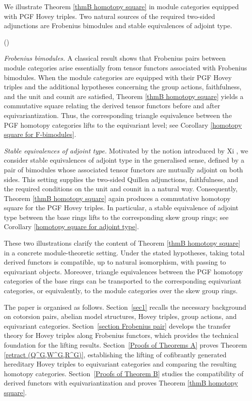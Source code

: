 \documentclass[12pt,twoside]{amsart}
\theoremstyle{bfupright head,slanted body}
\theoremstyle{bfupright head,upright body}
\theoremstyle{fixed bf head,slanted body}
\theoremstyle{fixed bf head,upright body}
\theoremstyle{numbered paragraph}
\newlength{\thmlistleft}        %
\newlength{\thmlistright}       %
\newlength{\thmlistpartopsep}   %
\newlength{\thmlisttopsep}      %
\newlength{\thmlistparsep}      %
\newlength{\thmlistitemsep}     %
\newcounter{rqm}
\newenvironment{rqm}{\begin{list}{\upshape (\arabic{rqm})}%
    {\usecounter{rqm}%
      \setlength{\leftmargin}{\thmlistleft}%
      \setlength{\labelwidth}{\thmlistleft}%
      \setlength{\rightmargin}{\thmlistright}%
      \setlength{\partopsep}{\thmlistpartopsep}%
      \setlength{\topsep}{\thmlisttopsep}%
      \setlength{\parsep}{\thmlistparsep}%
      \setlength{\itemsep}{\thmlistitemsep}}}%
  {\end{list}}%
\numberwithin{equation}{res}
\begin{document}
We illustrate Theorem \ref{thmB homotopy square} in module categories equipped with PGF Hovey triples.
Two natural sources of the required two-sided adjunctions are Frobenius bimodules and stable equivalences of adjoint type.

\begin{rqm}
\item \emph{Frobenius bimodules.}
A classical result \cite{1999CJG} shows that Frobenius pairs between module categories arise essentially from tensor functors associated with Frobenius bimodules.
When the module categories are equipped with their PGF Hovey triples and the additional hypotheses concerning the group actions, faithfulness, and the unit and counit are satisfied, Theorem \ref{thmB homotopy square} yields a commutative square relating the derived tensor functors before and after equivariantization.
Thus, the corresponding triangle equivalence between the PGF homotopy categories lifts to the equivariant level; see Corollary \ref{homotopy square for F-bimodules}.

\item \emph{Stable equivalences of adjoint type.}
Motivated by the notion introduced by Xi \cite[3.2]{2008Xi}, we consider stable equivalences of adjoint type in the generalised sense, defined by a pair of bimodules whose associated tensor functors are mutually adjoint on both sides.
This setting supplies the two-sided Quillen adjunctions, faithfulness, and the required conditions on the unit and counit in a natural way.
Consequently, Theorem \ref{thmB homotopy square} again produces a commutative homotopy square for the PGF Hovey triples.
In particular, a stable equivalence of adjoint type between the base rings lifts to the corresponding skew group rings; see Corollary \ref{homotopy square for adjoint type}.
\end{rqm}

These two illustrations clarify the content of Theorem \ref{thmB homotopy square} in a concrete module-theoretic setting.
Under the stated hypotheses, taking total derived functors is compatible, up to natural isomorphism, with passing to equivariant objects.
Moreover, triangle equivalences between the PGF homotopy categories of the base rings can be transported to the corresponding equivariant categories, or equivalently, to the module categories over the skew group rings.

The paper is organised as follows.
Section~\ref{sec1} recalls the necessary background on cotorsion pairs, abelian model structures, Hovey triples, group actions, and equivariant categories.
Section~\ref{section Frobenius pair} develops the transfer theory for Hovey triples along Frobenius functors, which provides the technical foundation for the lifting results.
Section~\ref{Proofs of Theorems A} proves Theorem \ref{retract (Q^G,W^G,R^G)}, establishing the lifting of cofibrantly generated hereditary Hovey triples to equivariant categories and comparing the resulting homotopy categories.
Section~\ref{Proofs of Theorem B} studies the compatibility of derived functors with equivariantization and proves Theorem \ref{thmB homotopy square}.
\end{document}
